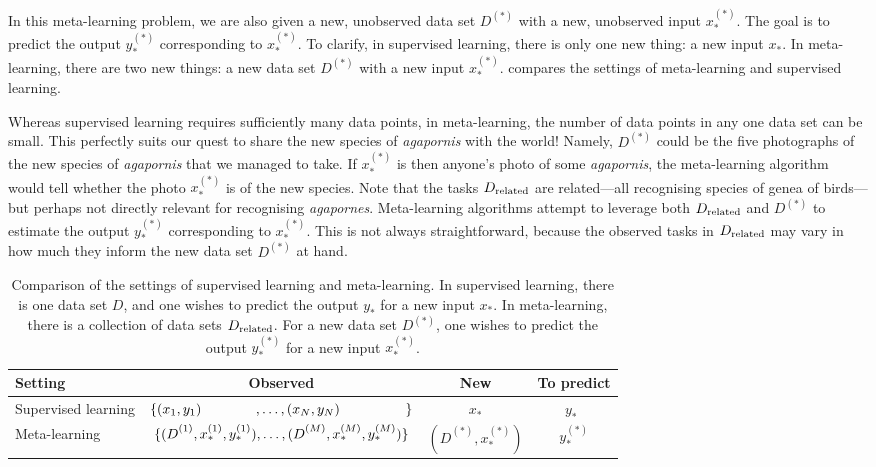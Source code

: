 \documentclass[12pt, twoside]{report}
\begin{document}
In this meta-learning problem, we are also given a new, unobserved data set $D^{(*)}$ with a new, unobserved input $\displaystyle x_*^{(*)}$.
The goal is to predict the output $\displaystyle y^{(*)}_*$ corresponding to $\displaystyle x_*^{(*)}$.
To clarify, in supervised learning, there is only one new thing: a new input $x_*$.
In meta-learning, there are two new things: a new data set $D^{(*)}$ with a new input $\displaystyle x^{(*)}_*$.
 compares the settings of meta-learning and supervised learning.

Whereas supervised learning requires sufficiently many data points,
in meta-learning, the number of data points in any one data set can be small.
This perfectly suits our quest to share the new species of \emph{agapornis} with the world!
Namely, $D^{(*)}$ could be the five photographs of the new species of \emph{agapornis} that we managed to take.
If $\displaystyle x^{(*)}_{*}$ is then anyone's photo of some \emph{agapornis},
the meta-learning algorithm would tell whether the photo $\displaystyle x^{(*)}_*$ is of the new species.
Note that the tasks $D\ss{related}$ are related---all recognising species of genea of birds---but perhaps not directly relevant for recognising \emph{agapornes}.
Meta-learning algorithms attempt to leverage both $D\ss{related}$ and $D^{(*)}$ to estimate the output $\displaystyle y^{(*)}_*$ corresponding to $\displaystyle x^{(*)}_*$.
This is not always straightforward, because the observed tasks in $D\ss{related}$ may vary in how much they inform the new data set $D^{(*)}$ at hand.

\begin{table}[t]
    \centering
    \small
    \caption[
        Comparison of supervised learning and meta-learning
    ]
    {
        Comparison of the settings of supervised learning and meta-learning.
        In supervised learning, there is one data set $D$, and one wishes to predict the output $y_*$ for a new input $x_*$.
        In meta-learning, there is a collection of data sets $D\ss{related}$.
        For a new data set $D^{(*)}$, one wishes
        to predict the output $y_*^{(*)}$ for a new input $x_*^{(*)}$.
    }
    \label{tab:supervised_vs_meta-learning}
    \begin{tabular}{lccc}
        \toprule       
        Setting & Observed & New & To predict \\ \midrule
        Supervised learning
        & $\{
            (x_1, y_1) \hspace{39pt},
            \ldots,
            (x_N, y_N)\hspace{47pt}
        \}$
        & $x_*$ 
        & $y_*\hspace{5pt}$ \\
        Meta-learning
        & $\displaystyle\{
            (D^{(1)}_{\phantom{*}}, x_*^{(1)}, y_*^{(1)}),
            \ldots,
            (D^{(M)}_{\phantom{*}}, x_*^{(M)}, y_*^{(M)})
        \}$
        & $\displaystyle(D^{(*)}_{\phantom{*}}, x_*^{(*)})$ 
        & $y_*^{(*)}$ \\  
        \bottomrule
    \end{tabular}
\end{table}
\end{document}
